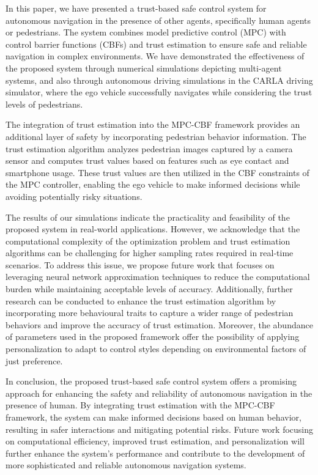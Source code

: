 \documentclass[journal]{IEEEtran}
\begin{document}
In this paper, we have presented a trust-based safe control system for autonomous navigation in the presence of other agents, specifically human agents or pedestrians. The system combines model predictive control (MPC) with control barrier functions (CBFs) and trust estimation to ensure safe and reliable navigation in complex environments. We have demonstrated the effectiveness of the proposed system through numerical simulations depicting multi-agent systems, and also through autonomous driving simulations in the CARLA driving simulator, where the ego vehicle successfully navigates while considering the trust levels of pedestrians.

The integration of trust estimation into the MPC-CBF framework provides an additional layer of safety by incorporating pedestrian behavior information. The trust estimation algorithm analyzes pedestrian images captured by a camera sensor and computes trust values based on features such as eye contact and smartphone usage. These trust values are then utilized in the CBF constraints of the MPC controller, enabling the ego vehicle to make informed decisions while avoiding potentially risky situations.

The results of our simulations indicate the practicality and feasibility of the proposed system in real-world applications. However, we acknowledge that the computational complexity of the optimization problem and trust estimation algorithms can be challenging for higher sampling rates required in real-time scenarios. To address this issue, we propose future work that focuses on leveraging neural network approximation techniques to reduce the computational burden while maintaining acceptable levels of accuracy. Additionally, further research can be conducted to enhance the trust estimation algorithm by incorporating more behavioural traits to capture a wider range of pedestrian behaviors and improve the accuracy of trust estimation. Moreover, the abundance of parameters used in the proposed framework offer the possibility of applying personalization to adapt to control styles depending on environmental factors of just preference.

In conclusion, the proposed trust-based safe control system offers a promising approach for enhancing the safety and reliability of autonomous navigation in the presence of human. By integrating trust estimation with the MPC-CBF framework, the system can make informed decisions based on human behavior, resulting in safer interactions and mitigating potential risks. Future work focusing on computational efficiency, improved trust estimation, and personalization will further enhance the system's performance and contribute to the development of more sophisticated and reliable autonomous navigation systems.




\end{document}
